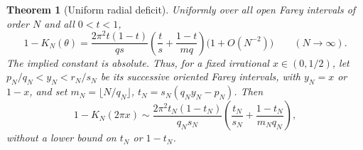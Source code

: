 \documentclass[11pt,a4paper]{article}
\newtheorem{theorem}{Theorem}[section]
\theoremstyle{definition}
\theoremstyle{remark}
\numberwithin{equation}{section}
\begin{document}
\begin{theorem}[Uniform radial deficit]\label{thm:farey-asymptotic}
Uniformly over all open Farey intervals of order $N$ and all $0<t<1$,
\begin{equation}\label{eq:uniform-farey-asymptotic}
 1-K_N(\theta)=
 \frac{2\pi^2t(1-t)}{qs}
 \left(\frac{t}{s}+\frac{1-t}{mq}\right)
 \bigl(1+O(N^{-2})\bigr)
 \qquad(N\to\infty).
\end{equation}
The implied constant is absolute.  Thus, for a fixed irrational
$x\in(0,1/2)$, let $p_N/q_N<y_N<r_N/s_N$ be its successive oriented
Farey intervals, with $y_N=x$ or $1-x$, and set
$m_N=\lfloor N/q_N\rfloor$, $t_N=s_N(q_Ny_N-p_N)$.  Then
\[
 1-K_N(2\pi x)\sim
 \frac{2\pi^2t_N(1-t_N)}{q_Ns_N}
 \left(\frac{t_N}{s_N}+\frac{1-t_N}{m_Nq_N}\right),
\]
without a lower bound on $t_N$ or $1-t_N$.
\end{theorem}
\end{document}
